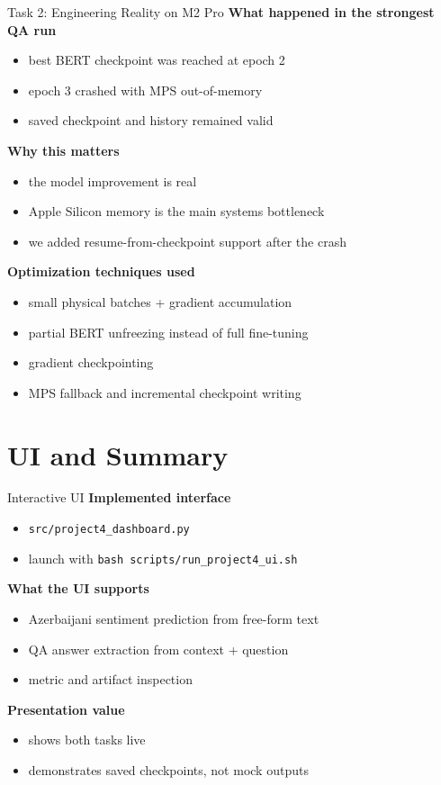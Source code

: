 \documentclass{beamer}
\begin{document}
\begin{frame}{Task 2: Engineering Reality on M2 Pro}
\small
\textbf{What happened in the strongest QA run}
\begin{itemize}
  \item best BERT checkpoint was reached at epoch 2
  \item epoch 3 crashed with MPS out-of-memory
  \item saved checkpoint and history remained valid
\end{itemize}

\vspace{0.3em}
\textbf{Why this matters}
\begin{itemize}
  \item the model improvement is real
  \item Apple Silicon memory is the main systems bottleneck
  \item we added resume-from-checkpoint support after the crash
\end{itemize}

\vspace{0.3em}
\textbf{Optimization techniques used}
\begin{itemize}
  \item small physical batches + gradient accumulation
  \item partial BERT unfreezing instead of full fine-tuning
  \item gradient checkpointing
  \item MPS fallback and incremental checkpoint writing
\end{itemize}
\end{frame}

\section{UI and Summary}

\begin{frame}{Interactive UI}
\small
\textbf{Implemented interface}
\begin{itemize}
  \item \texttt{src/project4\_dashboard.py}
  \item launch with \texttt{bash scripts/run\_project4\_ui.sh}
\end{itemize}

\vspace{0.3em}
\textbf{What the UI supports}
\begin{itemize}
  \item Azerbaijani sentiment prediction from free-form text
  \item QA answer extraction from context + question
  \item metric and artifact inspection
\end{itemize}

\vspace{0.3em}
\textbf{Presentation value}
\begin{itemize}
  \item shows both tasks live
  \item demonstrates saved checkpoints, not mock outputs
\end{itemize}
\end{frame}
\end{document}
